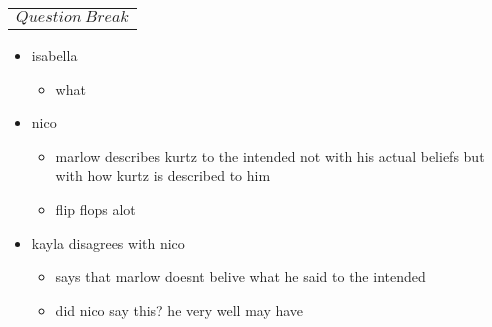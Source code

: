 \documentclass[letterpaper]{article}
\begin{document}
\begin{center}
\begin{tabular}{l}
\[Question\ Break\]\\
\end{tabular}
\end{center}

\begin{itemize}
\item isabella

\begin{itemize}
\item what
\end{itemize}

\item nico

\begin{itemize}
\item marlow describes kurtz to the intended not with his actual beliefs
but with how kurtz is described to him
\item flip flops alot
\end{itemize}

\item kayla disagrees with nico

\begin{itemize}
\item says that marlow doesnt belive what he said to the intended
\item did nico say this? he very well may have
\end{itemize}
\end{itemize}
\end{document}
